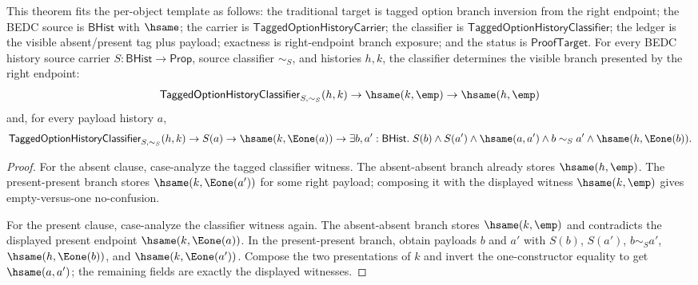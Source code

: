 \begin{theorem}
\label{thm:tagged-option-history-classifier-right-visible-branch-inversion}
This theorem fits the per-object template as follows: the traditional target is
tagged option branch inversion from the right endpoint; the BEDC source is
$\mathsf{BHist}$ with $\hsame$; the carrier is
$\mathsf{TaggedOptionHistoryCarrier}$; the classifier is
$\mathsf{TaggedOptionHistoryClassifier}$; the ledger is the visible
absent/present tag plus payload; exactness is right-endpoint branch exposure;
and the status is $\mathsf{ProofTarget}$. For every BEDC history source carrier
$S:\mathsf{BHist}\to\mathsf{Prop}$, source classifier $\sim_S$, and histories
$h,k$, the classifier determines the visible branch presented by the right
endpoint:
$$
\mathsf{TaggedOptionHistoryClassifier}_{S,\sim_S}(h,k)\to
\hsame(k,\emp)\to
\hsame(h,\emp)
$$
and, for every payload history $a$,
$$
\mathsf{TaggedOptionHistoryClassifier}_{S,\sim_S}(h,k)\to
S(a)\to
\hsame(k,\Eone(a))\to
\exists b,a':\mathsf{BHist}.\;
S(b)\land S(a')\land \hsame(a,a')\land b\sim_S a'\land
\hsame(h,\Eone(b)).
$$
\end{theorem}
\begin{proof}
For the absent clause, case-analyze the tagged classifier witness. The
absent-absent branch already stores $\hsame(h,\emp)$. The present-present branch
stores $\hsame(k,\Eone(a'))$ for some right payload; composing it with the
displayed witness $\hsame(k,\emp)$ gives empty-versus-one no-confusion.

For the present clause, case-analyze the classifier witness again. The
absent-absent branch stores $\hsame(k,\emp)$ and contradicts the displayed
present endpoint $\hsame(k,\Eone(a))$. In the present-present branch, obtain
payloads $b$ and $a'$ with $S(b)$, $S(a')$, $b\sim_S a'$,
$\hsame(h,\Eone(b))$, and $\hsame(k,\Eone(a'))$. Compose the two presentations
of $k$ and invert the one-constructor equality to get $\hsame(a,a')$; the
remaining fields are exactly the displayed witnesses.
\end{proof}

